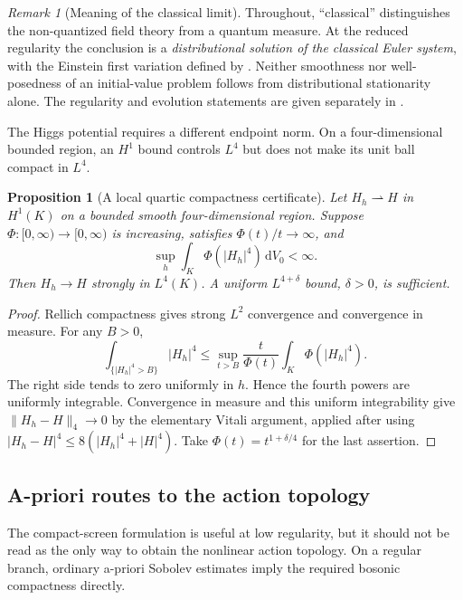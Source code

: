 \documentclass[11pt]{article}
\numberwithin{equation}{section}
\newtheorem{proposition}[proposition]{Proposition}
\theoremstyle{definition}
\theoremstyle{remark}
\newtheorem{remark}[remark]{Remark}
\newcommand{\dd}{\mathrm d}
\newcommand{\norm}[1]{\lVert#1\rVert}
\newcommand{\abs}[1]{\lvert#1\rvert}
\newcommand{\dV}{\dd V}
\begin{document}
\begin{remark}[Meaning of the classical limit]
\label{rem:classical-distributional}
Throughout, ``classical'' distinguishes the non-quantized field theory from
a quantum measure.  At the reduced regularity the conclusion is a
\emph{distributional solution of the classical Euler system}, with the
Einstein first variation defined by .  Neither smoothness
nor well-posedness of an initial-value problem follows from distributional
stationarity alone.  The regularity and evolution statements are given
separately in .
\end{remark}

The Higgs potential requires a different endpoint norm. On a four-dimensional bounded region, an $H^1$ bound controls $L^4$ but does not make its unit ball compact in $L^4$.

\begin{proposition}[A local quartic compactness certificate]
\label{prop:orlicz}
Let $H_h\rightharpoonup H$ in $H^1(K)$ on a bounded smooth four-dimensional region. Suppose $\Phi:[0,\infty)\to[0,\infty)$ is increasing, satisfies $\Phi(t)/t\to\infty$, and
\begin{equation}
 \sup_h\int_K\Phi(\abs{H_h}^4)\,\dV_0<\infty.
 \label{eq:orlicz}
\end{equation}
Then $H_h\to H$ strongly in $L^4(K)$. A uniform $L^{4+\delta}$ bound, $\delta>0$, is sufficient.
\end{proposition}
\begin{proof}
Rellich compactness gives strong $L^2$ convergence and convergence in measure. For any $B>0$,
\[
 \int_{\{\abs{H_h}^4>B\}}\abs{H_h}^4
 \le\sup_{t>B}\frac{t}{\Phi(t)}\int_K\Phi(\abs{H_h}^4).
\]
The right side tends to zero uniformly in $h$. Hence the fourth powers are uniformly integrable. Convergence in measure and this uniform integrability give $\norm{H_h-H}_4\to0$ by the elementary Vitali argument, applied after using $\abs{H_h-H}^4\le8(\abs{H_h}^4+\abs H^4)$. Take $\Phi(t)=t^{1+\delta/4}$ for the last assertion.
\end{proof}

\subsection{A-priori routes to the action topology}

The compact-screen formulation is useful at low regularity, but it should not be read as the only way to obtain the nonlinear action topology. On a regular branch, ordinary a-priori Sobolev estimates imply the required bosonic compactness directly.
\end{document}
